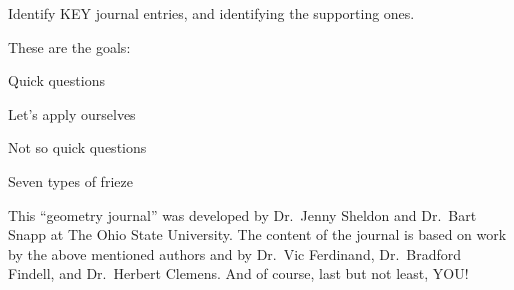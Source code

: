 \documentclass[handout,nooutcomes,noauthor]{ximera}
\begin{document}
Identify KEY journal entries, and identifying the supporting ones. 


These are the goals: 

Quick questions

Let's apply ourselves

Not so quick questions

Seven types of frieze






This ``geometry journal'' was developed by Dr.\ Jenny Sheldon and
Dr.\ Bart Snapp at The Ohio State University. The content of the
journal is based on work by the above mentioned authors and by
Dr.\ Vic Ferdinand, Dr.\ Bradford Findell, and Dr.\ Herbert Clemens.
And of course, last but not least, YOU!
\end{document}
